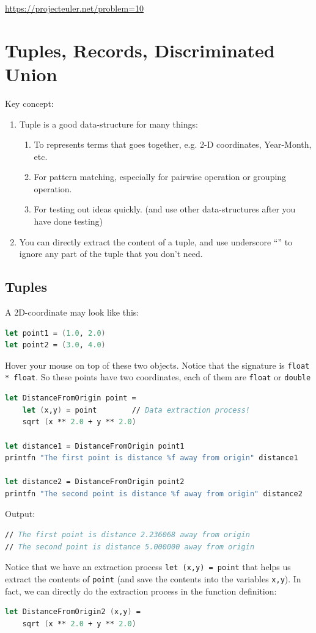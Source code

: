 \documentclass[12pt]{article}
\begin{document}
\url{https://projecteuler.net/problem=10}

\pagebreak


\section{Tuples, Records, Discriminated Union}
Key concept:
\begin{enumerate}
\item Tuple is a good data-structure for many things:
\begin{enumerate}
\item To represents terms that goes together, e.g. 2-D coordinates, Year-Month, etc.
\item For pattern matching, especially for pairwise operation or grouping operation.
\item For testing out ideas quickly. (and use other data-structures after you have done testing)
\end{enumerate} 
\item You can directly extract the content of a tuple, and use underscore ``\underline{\:\:}'' to ignore any part of the tuple that you don't need.
\end{enumerate}

\subsection{Tuples}
A 2D-coordinate may look like this:
\begin{lstlisting}[language=FSharp]
let point1 = (1.0, 2.0)
let point2 = (3.0, 4.0)
\end{lstlisting}
Hover your mouse on top of these two objects. Notice that the signature is \texttt{float * float}. So these points have two coordinates, each of them are \texttt{float} or \texttt{double}

\begin{lstlisting}[language=FSharp]
let DistanceFromOrigin point =
    let (x,y) = point        // Data extraction process!
    sqrt (x ** 2.0 + y ** 2.0)

let distance1 = DistanceFromOrigin point1
printfn "The first point is distance %f away from origin" distance1

let distance2 = DistanceFromOrigin point2
printfn "The second point is distance %f away from origin" distance2
\end{lstlisting}
Output:
\begin{lstlisting}[language=FSharp]
// The first point is distance 2.236068 away from origin
// The second point is distance 5.000000 away from origin
\end{lstlisting}
Notice that we have an extraction process \texttt{let (x,y) = point} that helps us extract the contents of \texttt{point} (and save the contents into the variables \texttt{x,y}). In fact, we can directly do the extraction process in the function definition:
\begin{lstlisting}[language=FSharp]
let DistanceFromOrigin2 (x,y) =
    sqrt (x ** 2.0 + y ** 2.0)
\end{lstlisting}
\pagebreak
\end{document}
